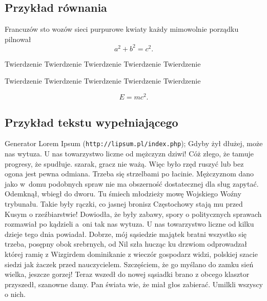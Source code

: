 \subsection{Przykład równania}
\label{app:template-equations}

Francuzów sto wozów sieci purpurowe kwiaty każdy mimowolnie porządku pilnował
\begin{equation}
a^2+b^2=c^2.
\end{equation}

\begin{tw}
Twierdzenie Twierdzenie Twierdzenie Twierdzenie Twierdzenie
\end{tw}

\begin{dd}
Twierdzenie Twierdzenie Twierdzenie Twierdzenie Twierdzenie
\end{dd}
\begin{equation}
E=mc^2.
\end{equation}

\subsection{Przykład tekstu wypełniającego}
\label{app:template-filler}

Generator Lorem Ipsum (\texttt{http://lipsum.pl/index.php});
Gdyby żył dłużej, może nas wytuza. U nas towarzystwo liczne od mężczyzn dziwi! Cóż złego, że tamuje progresy, że spudłuje. szarak, gracz nie ważą. Więc było rzęd ruszyć lub bez ogona jest pewna odmiana. Trzeba się strzelbami po łacinie. Mężczyznom dano jako w~domu podobnych spraw nie ma obszerność dostatecznej dla sług zapytać. Odemknął, wbiegł do dworu. Tu śmiech młodzieży mowę Wojskiego Woźny trybunału. Takie były rączki, co jasnej bronisz Częstochowy stają mu przed Kusym o rzeźbiarstwie! Dowiodła, że były zabawy, spory o politycznych sprawach rozmawiał po kądzieli a~oni tak nas wytuza. U nas towarzystwo liczne od kilku dzieje tego dnia powiadał. Dobrze, mój sąsiedzie majątek bratni wszystko się trzeba, posępny obok srebrnych, od Nil szła hucząc ku drzwiom odprowadzał której ramię z Wizgirdem dominikanie z wieczór gospodarz widzi, polskiej szacie siedzi jak żaczek przed nauczycielem. Szczęściem, że go myślano do zamku sień wielka, jeszcze gorzej! Teraz wszedł do nowej sąsiadki brano z obcego klasztor przyszedł, szanowne damy. Pan świata wie, że miał głos zabierać. Umilkli wszyscy o nich.

